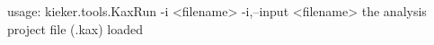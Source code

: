usage: kieker.tools.KaxRun -i <filename>
 -i,--input <filename>   the analysis project file (.kax) loaded
